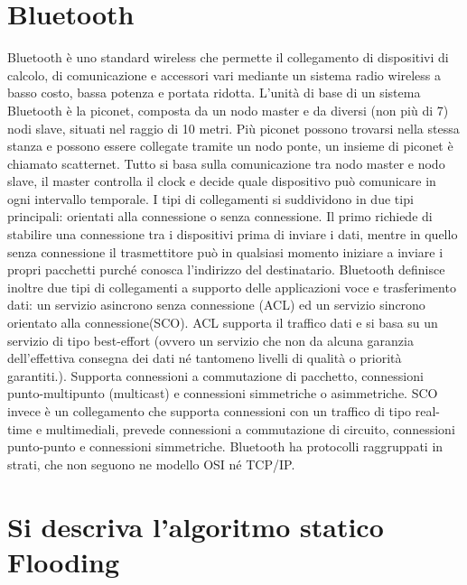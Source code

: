 \section{Bluetooth}

Bluetooth è uno standard wireless che permette il collegamento di dispositivi di calcolo, di comunicazione e accessori vari mediante un sistema radio wireless a basso costo, bassa potenza e portata ridotta.
L’unità di base di un sistema Bluetooth è la piconet, composta da un nodo master e da diversi (non più di 7) nodi slave, situati nel raggio di 10 metri. Più piconet possono trovarsi nella stessa stanza e possono essere collegate tramite un nodo ponte, un insieme di piconet è chiamato scatternet.
Tutto si basa sulla comunicazione tra nodo master e nodo slave, il master controlla il clock e decide quale dispositivo può comunicare in ogni intervallo temporale.
I tipi di collegamenti si suddividono in due tipi principali: orientati alla connessione o senza connessione.
Il primo richiede di stabilire una connessione tra i dispositivi prima di inviare i dati, mentre in quello senza connessione il trasmettitore può in qualsiasi momento iniziare a inviare i propri pacchetti purché conosca l’indirizzo del destinatario.
Bluetooth definisce inoltre due tipi di collegamenti a supporto delle applicazioni voce e trasferimento dati: un servizio asincrono senza connessione (ACL) ed un servizio sincrono orientato alla connessione(SCO).
ACL supporta il traffico dati e si basa su un servizio di tipo best-effort (ovvero un servizio che non da alcuna garanzia dell’effettiva consegna dei dati né tantomeno livelli di qualità o priorità garantiti.).
Supporta connessioni a commutazione di pacchetto, connessioni punto-multipunto (multicast) e connessioni simmetriche o asimmetriche.
SCO invece è un collegamento che supporta connessioni con un traffico di tipo real-time e multimediali, prevede connessioni a commutazione di circuito, connessioni punto-punto e connessioni simmetriche.
Bluetooth ha protocolli raggruppati in strati, che non seguono ne modello OSI né TCP/IP.

\section{Si descriva l’algoritmo statico Flooding}


